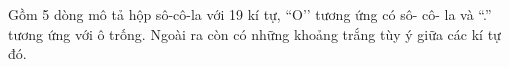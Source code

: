 Gồm 5 dòng mô tả hộp sô-cô-la với 19 kí tự, “O’’ tương ứng có sô- cô- la và “.” tương ứng với ô trống. Ngoài ra còn có những khoảng trắng tùy ý giữa các kí tự đó.
